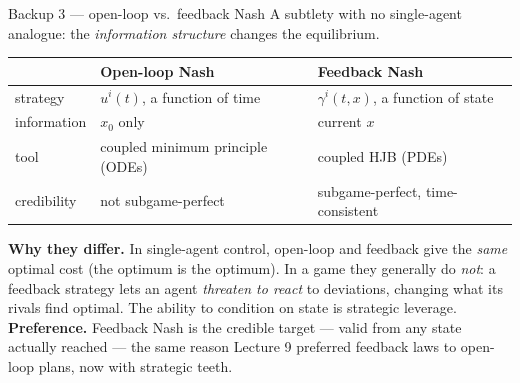 \documentclass[10pt, aspectratio=169]{beamer}
\begin{document}
\begin{frame}{Backup 3 --- open-loop vs.\ feedback Nash}
\footnotesize
A subtlety with no single-agent analogue: the \emph{information structure} changes the equilibrium.
\medskip
\begin{center}\scriptsize\renewcommand{\arraystretch}{1.4}
\begin{tabular}{l|l|l}
 & \textbf{Open-loop Nash} & \textbf{Feedback Nash} \\
\hline
strategy & $u^i(t)$, a function of time & $\gamma^i(t,x)$, a function of state \\
information & $x_0$ only & current $x$ \\
tool & coupled minimum principle (ODEs) & coupled HJB (PDEs) \\
credibility & not subgame-perfect & \alert{subgame-perfect}, time-consistent \\
\end{tabular}
\end{center}
\medskip
\textbf{Why they differ.} In single-agent control, open-loop and feedback give the \emph{same} optimal cost (the optimum is the optimum). In a game they generally do \emph{not}: a feedback strategy lets an agent \emph{threaten to react} to deviations, changing what its rivals find optimal. The ability to condition on state is strategic leverage. \textbf{Preference.} Feedback Nash is the credible target --- valid from any state actually reached --- the same reason Lecture 9 preferred feedback laws to open-loop plans, now with strategic teeth.
\end{frame}
\end{document}
